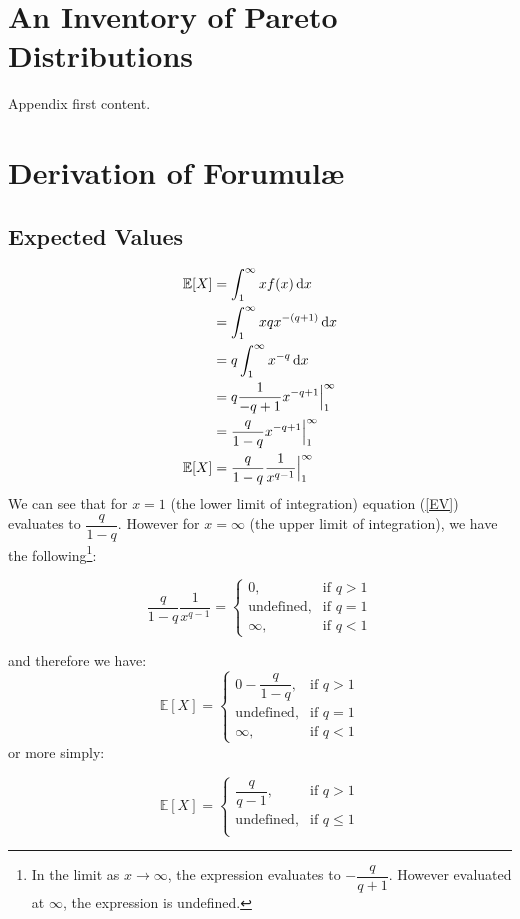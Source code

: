 \documentclass[]{article} %
\begin{document}
\section{An Inventory of Pareto Distributions}\label{ParetoInventory}
Appendix first content.
\section{Derivation of Forumul\ae}
\subsection{Expected Values}\label{sec:ParetoEV}
\begin{align}
\mathbb{E}[X] & = \int_{1}^{\infty}x f(x) \operatorname{d \!} x \nonumber\\
& = \int_{1}^{\infty}xqx^{-(q+1)} \operatorname{d \!} x\nonumber\\
& = q \int_{1}^{\infty}x^{-q} \operatorname{d \!} x\nonumber\\
& = q \frac{1}{-q+1} x^{-q+1} \Big|_{1}^{\infty}\nonumber\\
& = \frac{q}{1-q} x^{-q+1} \Big|_{1}^{\infty}\nonumber\\
\mathbb{E}[X] 	& = \frac{q}{1-q} \dfrac{1}{x^{q-1}} \Big|_{1}^{\infty}\label{eqn:ParetoEV}
\end{align}
We can see that for $x = 1$ (the lower limit of integration) equation (\ref{EV}) evaluates to $\dfrac{q}{1-q}$. However for $x = \infty$ (the upper limit of integration), we have the following\footnote{In the limit as $x\to\infty$, the expression evaluates to  $-\dfrac{q}{q+1}$. However evaluated at $\infty$, the expression is undefined.}:

\[
\frac{q}{1-q} \dfrac{1}{x^{q-1}} = 
\begin{cases}
0,& \text{if } q > 1\\
\text{undefined},& \text{if }q = 1\\         
\infty, & \text{if }q < 1
\end{cases}
\]

and therefore we have: 
\[
\mathbb{E}[X]  = 
\begin{cases}
0 - \dfrac{q}{1-q},& \text{if } q > 1\\
\text{undefined},& \text{if } q = 1\\         
\infty, & \text{if }q < 1
\end{cases}
\]
or more simply:

\begin{equation}
\mathbb{E}[X]  = 
\begin{cases}
\dfrac{q}{q-1},& \text{if } q > 1\\
\text{undefined},& \text{if } q \leq 1\\         
\end{cases}
\end{equation}
\end{document}
